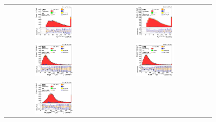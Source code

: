 \begin{figure}[ht]
  \begin{center}
    \begin{tabular}{ccc}
      \includegraphics[width=0.4\textwidth]{figures/tW/fig/MVA_input/ee/H_2j1b_l1_pt.png}&
      \includegraphics[width=0.4\textwidth]{figures/tW/fig/MVA_input/mumu/H_2j1b_l1_pt.png}\\
      \includegraphics[width=0.4\textwidth]{figures/tW/fig/MVA_input/ee/H_2j1b_M_j1_j2.png}&
      \includegraphics[width=0.4\textwidth]{figures/tW/fig/MVA_input/mumu/H_2j1b_M_j1_j2.png}\\
      \includegraphics[width=0.4\textwidth]{figures/tW/fig/MVA_input/ee/H_2j1b_M_l1_j2.png}&

\end{tabular}
\end{center}
\end{figure}
